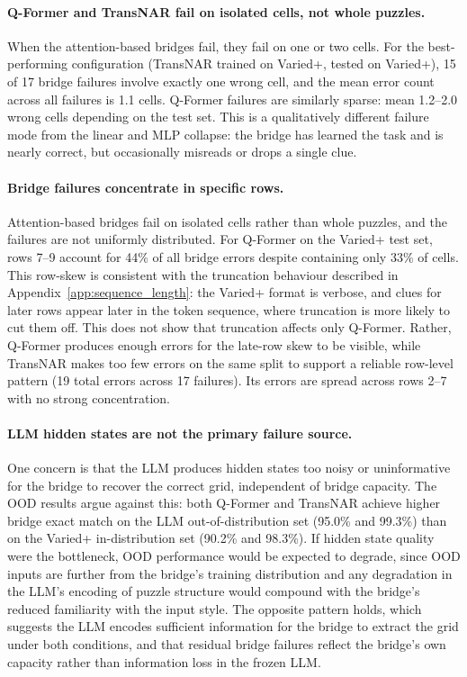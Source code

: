 \documentclass[11pt]{article}
\begin{document}
\paragraph{Q-Former and TransNAR fail on isolated cells, not whole puzzles.}
When the attention-based bridges fail, they fail on one or two cells.
For the best-performing configuration (TransNAR trained on Varied+, tested on Varied+), 15 of 17 bridge failures involve exactly one wrong cell, and the mean error count across all failures is 1.1 cells.
Q-Former failures are similarly sparse: mean 1.2--2.0 wrong cells depending on the test set.
This is a qualitatively different failure mode from the linear and MLP collapse: the bridge has learned the task and is nearly correct, but occasionally misreads or drops a single clue.

\paragraph{Bridge failures concentrate in specific rows.}
Attention-based bridges fail on isolated cells rather than whole puzzles, and the failures are not uniformly distributed.
For Q-Former on the Varied+ test set, rows 7--9 account for 44\% of all bridge errors despite containing only 33\% of cells.
This row-skew is consistent with the truncation behaviour described in Appendix~\ref{app:sequence_length}: the Varied+ format is verbose, and clues for later rows appear later in the token sequence, where truncation is more likely to cut them off.
This does not show that truncation affects only Q-Former.
Rather, Q-Former produces enough errors for the late-row skew to be visible, while TransNAR makes too few errors on the same split to support a reliable row-level pattern (19 total errors across 17 failures).
Its errors are spread across rows 2--7 with no strong concentration.

\paragraph{LLM hidden states are not the primary failure source.}
One concern is that the LLM produces hidden states too noisy or uninformative for the bridge to recover the correct grid, independent of bridge capacity.
The OOD results argue against this: both Q-Former and TransNAR achieve higher bridge exact match on the LLM out-of-distribution set (95.0\% and 99.3\%) than on the Varied+ in-distribution set (90.2\% and 98.3\%).
If hidden state quality were the bottleneck, OOD performance would be expected to degrade, since OOD inputs are further from the bridge's training distribution and any degradation in the LLM's encoding of puzzle structure would compound with the bridge's reduced familiarity with the input style.
The opposite pattern holds, which suggests the LLM encodes sufficient information for the bridge to extract the grid under both conditions, and that residual bridge failures reflect the bridge's own capacity rather than information loss in the frozen LLM.
\end{document}
